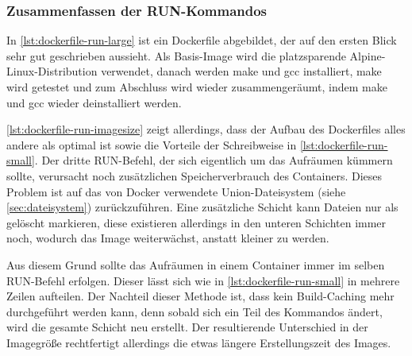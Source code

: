 \subsubsection{Zusammenfassen der RUN-Kommandos}
In \cref{lst:dockerfile-run-large} ist ein Dockerfile abgebildet, der auf den ersten Blick sehr gut geschrieben aussieht.
Als Basis-Image wird die platzsparende Alpine-Linux-Distribution verwendet, danach werden make und gcc installiert, make wird getestet und zum Abschluss wird wieder zusammengeräumt, indem make und gcc wieder deinstalliert werden.

\cref{lst:dockerfile-run-imagesize} zeigt allerdings, dass der Aufbau des Dockerfiles alles andere als optimal ist sowie die Vorteile der Schreibweise in \cref{lst:dockerfile-run-small}.
Der dritte RUN-Befehl, der sich eigentlich um das Aufräumen kümmern sollte, verursacht noch zusätzlichen Speicherverbrauch des Containers.
Dieses Problem ist auf das von Docker verwendete Union-Dateisystem (siehe \cref{sec:dateisystem}) zurückzuführen.
Eine zusätzliche Schicht kann Dateien nur als gelöscht markieren, diese existieren allerdings in den unteren Schichten immer noch, wodurch das Image weiterwächst, anstatt kleiner zu werden.

Aus diesem Grund sollte das Aufräumen in einem Container immer im selben RUN-Befehl erfolgen.
Dieser lässt sich wie in \cref{lst:dockerfile-run-small} in mehrere Zeilen aufteilen.
Der Nachteil dieser Methode ist, dass kein Build-Caching mehr durchgeführt werden kann, denn sobald sich ein Teil des Kommandos ändert, wird die gesamte Schicht neu erstellt.
Der resultierende Unterschied in der Imagegröße rechtfertigt allerdings die etwas längere Erstellungszeit des Images.



